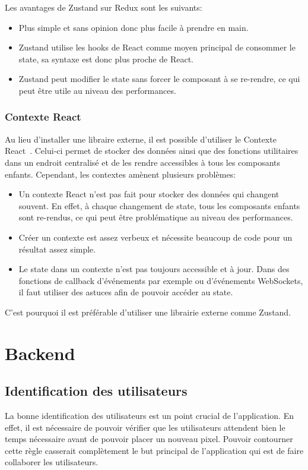 Les avantages de Zustand sur Redux sont les suivants:
\begin{itemize}
  \item Plus simple et sans opinion donc plus facile à prendre en main.
  \item Zustand utilise les hooks de React comme moyen principal de consommer le state, sa syntaxe est donc plus proche de React.
  \item Zustand peut modifier le state sans forcer le composant à se re-rendre, ce qui peut être utile au niveau des performances.
\end{itemize}

\subsubsection{Contexte React}

Au lieu d'installer une libraire externe, il est possible d'utiliser le Contexte React~\cite{react-context}. Celui-ci permet de stocker des données ainsi que des fonctions utilitaires dans un endroit centralisé et de les rendre accessibles à tous les composants enfants. Cependant, les contextes amènent plusieurs problèmes:

\begin{itemize}
  \item Un contexte React n'est pas fait pour stocker des données qui changent souvent. En effet, à chaque changement de state, tous les composants enfants sont re-rendus, ce qui peut être problématique au niveau des performances.
  \item Créer un contexte est assez verbeux et nécessite beaucoup de code pour un résultat assez simple.
  \item Le state dans un contexte n'est pas toujours accessible et à jour. Dans des fonctions de callback d'événements par exemple ou d'événements WebSockets, il faut utiliser des astuces afin de pouvoir accéder au state.
\end{itemize}

C'est pourquoi il est préférable d'utiliser une librairie externe comme Zustand.

\section{Backend}

\subsection{Identification des utilisateurs}
La bonne identification des utilisateurs est un point crucial de l'application. En effet, il est nécessaire de pouvoir vérifier que les utilisateurs attendent bien le temps nécessaire avant de pouvoir placer un nouveau pixel. Pouvoir contourner cette règle casserait complètement le but principal de l'application qui est de faire collaborer les utilisateurs.

